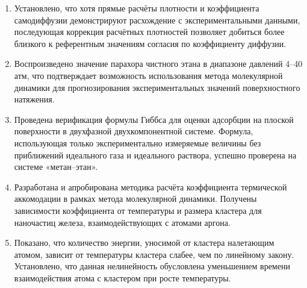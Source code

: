 
\begin{enumerate}
  \item Установлено, что хотя прямые расчёты плотности и коэффициента самодиффузии демонстрируют расхождение с экспериментальными данными, последующая коррекция расчётных плотностей позволяет добиться более близкого к референтным значениям согласия по коэффициенту диффузии.
  \item Воспроизведено значение парахора чистного этана в диапазоне давлений 4–40 атм, что подтверждает возможность использования метода молекулярной динамики для прогнозирования экспериментальных значений поверхностного натяжения.
  \item Проведена верификация формулы Гиббса для оценки адсорбции на плоской поверхности в двухфазной двухкомпонентной системе. Формула, использующая только экспериментально измеряемые величины без приближений идеального газа и идеального раствора, успешно проверена на системе «метан–этан».
  \item Разработана и апробирована методика расчёта коэффициента термической аккомодации в рамках метода молекулярной динамики. Получены зависимости коэффициента от температуры и размера кластера для наночастиц железа, взаимодействующих с атомами аргона.
  \item Показано, что количество энергии, уносимой от кластера налетающим атомом, зависит от температуры кластера слабее, чем по линейному закону. Установлено, что данная нелинейность обусловлена уменьшением времени взаимодействия атома с кластером при росте температуры.
\end{enumerate}
